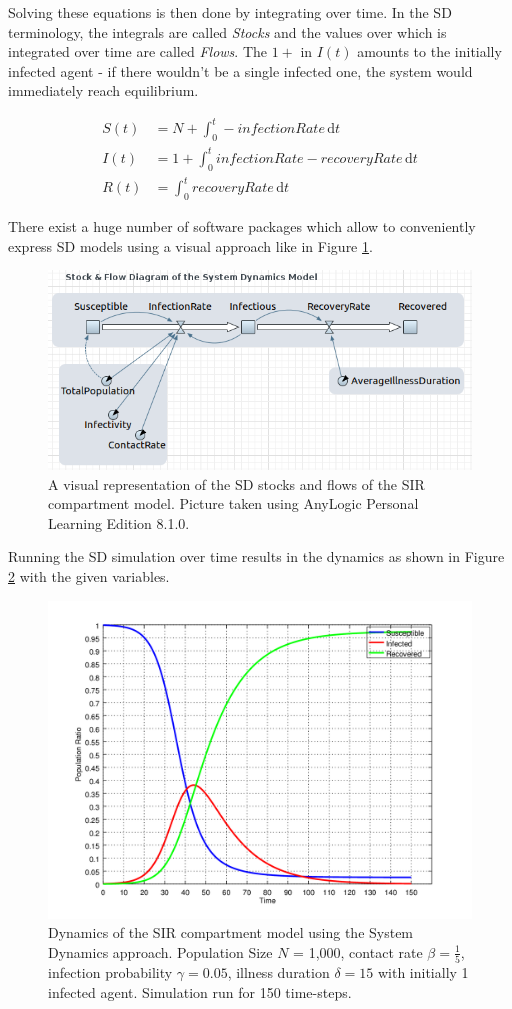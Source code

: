 Solving these equations is then done by integrating over time. In the SD terminology, the integrals are called \textit{Stocks} and the values over which is integrated over time are called \textit{Flows}. The $1+$ in $I(t)$ amounts to the initially infected agent - if there wouldn't be a single infected one, the system would immediately reach equilibrium.

\begin{align}
S(t) &= N + \int_0^t -infectionRate\, \mathrm{d}t \\
I(t) &= 1 + \int_0^t infectionRate - recoveryRate\, \mathrm{d}t \\
R(t) &= \int_0^t recoveryRate\, \mathrm{d}t
\end{align}

There exist a huge number of software packages which allow to conveniently express SD models using a visual approach like in Figure \ref{fig:sir_sd_stockflow_diagramm}.

\begin{figure}
	\centering
	\includegraphics[width=.4\textwidth, angle=0]{./../shared/fig/diagrams/SIR_SD_STOCKFLOW_DIAGRAMM.png}
	\caption{A visual representation of the SD stocks and flows of the SIR compartment model. Picture taken using AnyLogic Personal Learning Edition 8.1.0.}
	\label{fig:sir_sd_stockflow_diagramm}
\end{figure}

Running the SD simulation over time results in the dynamics as shown in Figure \ref{fig:sir_sd_dynamics} with the given variables.

\begin{figure}
	\centering
	\includegraphics[width=.4\textwidth, angle=0]{./../shared/fig/frsd/SIR_SD_1000agents_150t_001dt.png}
	\caption{Dynamics of the SIR compartment model using the System Dynamics approach. Population Size $N$ = 1,000, contact rate $\beta =  \frac{1}{5}$, infection probability $\gamma = 0.05$, illness duration $\delta = 15$ with initially 1 infected agent. Simulation run for 150 time-steps.}
	\label{fig:sir_sd_dynamics}
\end{figure}

